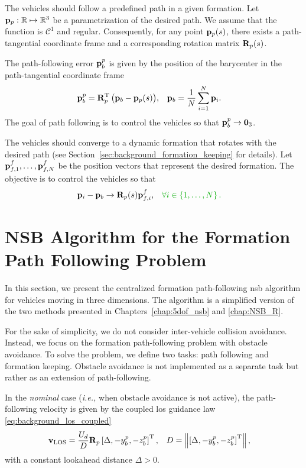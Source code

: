 The vehicles should follow a predefined path in a given formation.
Let $\mathbf{p}_p: \mathbb{R} \mapsto \mathbb{R}^3$ be a parametrization of the desired path.
We assume that the function is $\mathcal{C}^1$ and regular.
Consequently, for any point $\mathbf{p}_p(s)$, there exists a path-tangential coordinate frame and a corresponding rotation matrix $\mathbf{R}_p(s)$.

The path-following error $\mathbf{p}_b^p$ is given by the position of the barycenter in the path-tangential coordinate frame 
\begin{align}
    \mathbf{p}_b^p &= \mathbf{R}_p^{\mathrm{T}} \, \big(\mathbf{p}_b - \mathbf{p}_p(s)\big), &
    \mathbf{p}_b &= \frac{1}{N} \sum_{i=1}^N \mathbf{p}_i.
    \label{eq:distr_NSB_barycenter}
\end{align}
The goal of path following is to control the vehicles so that $\mathbf{p}_b^p \rightarrow \mathbf{0}_3$.

The vehicles should converge to a dynamic formation that rotates with the desired path (see Section~\ref{sec:background_formation_keeping} for details).
Let $\mathbf{p}_{f,1}^f, \ldots, \mathbf{p}_{f,N}^f$ be the position vectors that represent the desired formation.
The objective is to control the vehicles so that
\begin{align}
    \mat{p}_i - \mat{p}_b &\rightarrow \mat{R}_p(s) \mat{p}_{f,i}^f, &
    \dm{\forall i &\in \left\{1, \ldots, N \right\}.}
\end{align}

\section{NSB Algorithm for the Formation Path Following Problem}
\label{sec:distr_NSB_NSB}
In this section, we present the centralized formation path-following \gls{nsb} algorithm for vehicles moving in three dimensions.
The algorithm is a simplified version of the two methods presented in Chapters~\ref{chap:5dof_nsb} and \ref{chap:NSB_R}.

For the sake of simplicity, we do not consider inter-vehicle collision avoidance.
Instead, we focus on the formation path-following problem with obstacle avoidance.
To solve the problem, we define two tasks: path following and formation keeping.
Obstacle avoidance is not implemented as a separate task but rather as an extension of path-following.

In the \emph{nominal} case (\emph{i.e.,} when obstacle avoidance is not active), the path-following velocity is given by the coupled \acrfull{los} guidance law \eqref{eq:background_los_coupled}
\begin{align}
    \mathbf{v}_{\rm LOS} &= \frac{U_d}{D} \mathbf{R}_p \left[\Delta, -y_b^p, -z_b^p\right]^{\mathrm{T}}, &
    D &= \left\|\left[\Delta, -y_b^p, -z_b^p\right]^{\mathrm{T}}\right\|,
    \label{eq:distr_NSB_v_LOS_centralized}
\end{align}
with a constant lookahead distance $\Delta > 0$.

